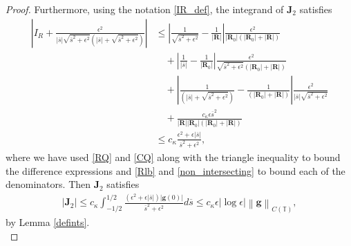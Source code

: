\documentclass[11pt]{article}
\numberwithin{equation}{section}
\newcommand{\T}{\mathbb{T}}
\newcommand{\bars}{\overline s}
\newcommand{\abs}[1]{\left\lvert #1 \right\rvert}
\newcommand{\norm}[1]{\left\lVert #1 \right\rVert}
\theoremstyle{definition}
\begin{document}
\begin{proof}
Furthermore, using the notation \eqref{IR_def}, the integrand of $\bm{J}_2$ satisfies
\begin{align*}
\abs{I_R +\frac{\epsilon^2}{\abs{\bars}\sqrt{\bars^2+\epsilon^2} (\abs{\bars}+\sqrt{\bars^2+\epsilon^2})} } &\le \abs{\frac{1}{\sqrt{\bars^2+\epsilon^2}} - \frac{1}{\abs{\bm{R}}}} \frac{\epsilon^2}{\abs{\bm{R}_0} (\abs{\bm{R}_0}+\abs{\bm{R}})}  \\
&\quad + \abs{\frac{1}{\abs{\bars}} - \frac{1}{\abs{\bm{R}_0}} } \frac{\epsilon^2}{\sqrt{\bars^2+\epsilon^2} (\abs{\bm{R}_0}+\abs{\bm{R}})}  \\ 
&\quad +\abs{\frac{1}{(\abs{\bars}+\sqrt{\bars^2+\epsilon^2})}- \frac{1}{(\abs{\bm{R}_0}+\abs{\bm{R}})}}\frac{\epsilon^2}{\abs{\bars}\sqrt{\bars^2+\epsilon^2}} \\
&\quad + \frac{c_\kappa\epsilon \bars^2}{\abs{\bm{R}}\abs{\bm{R}_0}(\abs{\bm{R}_0}+\abs{\bm{R}})} \\
%
%
&\le c_\kappa \frac{\epsilon^2+\epsilon\abs{\bars}}{\bars^2+\epsilon^2} ,
\end{align*}
where we have used \eqref{RQ} and \eqref{CQ} along with the triangle inequality to bound the difference expressions and \eqref{Rlb} and \eqref{non_intersecting} to bound each of the denominators. Then $\bm{J}_2$ satisfies
\begin{align*}
\abs{\bm{J}_2} \le c_\kappa \int_{-1/2}^{1/2} \frac{(\epsilon^2+\epsilon\abs{\bars})|\bm{g}(0)|}{\bars^2+\epsilon^2} d\bars \le c_\kappa \epsilon\abs{\log\epsilon} \norm{\bm{g}}_{C(\T)},
\end{align*}
by Lemma \ref{defints}. \\


\end{proof}
\end{document}
